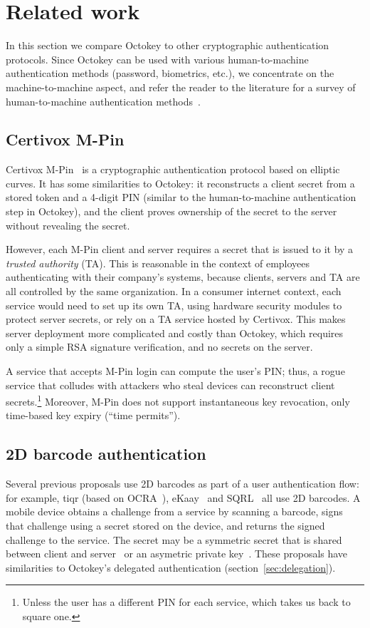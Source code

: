 \section{Related work}\label{sec:otherapproaches}

In this section we compare Octokey to other cryptographic authentication protocols. Since Octokey
can be used with various human-to-machine authentication methods (password, biometrics, etc.), we
concentrate on the machine-to-machine aspect, and refer the reader to the literature for a survey of
human-to-machine authentication methods~\cite{Bonneau12}.

\subsection{Certivox M-Pin}

Certivox M-Pin~\cite{Scott14} is a cryptographic authentication protocol based on elliptic curves.
It has some similarities to Octokey: it reconstructs a client secret from a stored token and a
4-digit PIN (similar to the human-to-machine authentication step in Octokey), and the client proves
ownership of the secret to the server without revealing the secret.

However, each M-Pin client and server requires a secret that is issued to it by a \emph{trusted
authority} (TA). This is reasonable in the context of employees authenticating with their company's
systems, because clients, servers and TA are all controlled by the same organization. In a consumer
internet context, each service would need to set up its own TA, using hardware security modules to
protect server secrets, or rely on a TA service hosted by Certivox. This makes server deployment
more complicated and costly than Octokey, which requires only a simple RSA signature verification,
and no secrets on the server.

A service that accepts M-Pin login can compute the user's PIN; thus, a rogue service that colludes
with attackers who steal devices can reconstruct client secrets.\footnote{Unless the user has a
different PIN for each service, which takes us back to square one.} Moreover, M-Pin does not support
instantaneous key revocation, only time-based key expiry (``time permits'').

\subsection{2D barcode authentication}

Several previous proposals use 2D barcodes as part of a user authentication flow: for example, tiqr
(based on OCRA~\cite{OCRA}), eKaay~\cite{Borchert11} and SQRL~\cite{Gibson13} all use 2D barcodes.
A mobile device obtains a challenge from a service by scanning a barcode, signs that challenge using
a secret stored on the device, and returns the signed challenge to the service. The secret may be a
symmetric secret that is shared between client and server~\cite{OCRA} or an asymetric private
key~\cite{Gibson13}. These proposals have similarities to Octokey's delegated authentication
(section~\ref{sec:delegation}).

